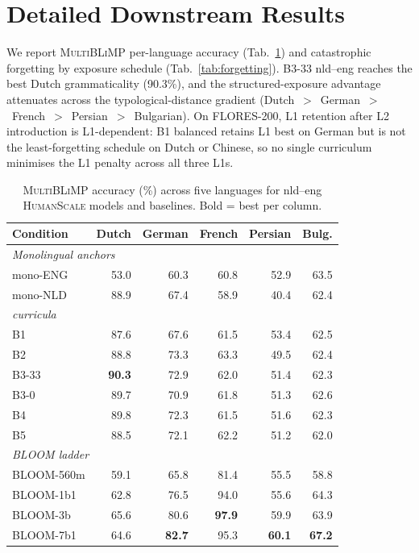  
\section{Detailed Downstream Results}\label{sec:downstream}
 
We report \beetle{} \textsc{MultiBLiMP} per-language accuracy (Tab.~\ref{tab:multiblimp}) and catastrophic forgetting by exposure schedule (Tab.~\ref{tab:forgetting}). B3-33 nld--eng reaches the best \beetle{} Dutch grammaticality (90.3\%), and the structured-exposure advantage attenuates across the typological-distance gradient (Dutch~$>$~German~$>$~French~$>$~Persian~$>$~Bulgarian). On FLORES-200, L1 retention after L2 introduction is L1-dependent: B1 balanced retains L1 best on German but is not the least-forgetting schedule on Dutch or Chinese, so no single curriculum minimises the L1 penalty across all three L1s.
 
\begin{table}[!ht]
  \centering \small
  \caption{\textsc{MultiBLiMP} accuracy (\%) across five languages for nld--eng \textsc{HumanScale} \beetle{} models and baselines. Bold = best per column.}
  \label{tab:multiblimp}
  \begin{tabular}{lrrrrr}
    \toprule
    Condition & Dutch & German & French & Persian & Bulg. \\
    \midrule
    \multicolumn{6}{l}{\emph{Monolingual anchors}} \\
    mono-ENG & 53.0 & 60.3 & 60.8 & 52.9 & 63.5 \\
    mono-NLD & 88.9 & 67.4 & 58.9 & 40.4 & 62.4 \\
    \midrule
    \multicolumn{6}{l}{\emph{\beetle{} curricula}} \\
    B1       & 87.6 & 67.6 & 61.5 & 53.4 & 62.5 \\
    B2       & 88.8 & 73.3 & 63.3 & 49.5 & 62.4 \\
    B3-33    & \textbf{90.3} & 72.9 & 62.0 & 51.4 & 62.3 \\
    B3-0     & 89.7 & 70.9 & 61.8 & 51.3 & 62.6 \\
    B4       & 89.8 & 72.3 & 61.5 & 51.6 & 62.3 \\
    B5       & 88.5 & 72.1 & 62.2 & 51.2 & 62.0 \\
    \midrule
    \multicolumn{6}{l}{\emph{BLOOM ladder}} \\
    BLOOM-560m & 59.1 & 65.8 & 81.4 & 55.5 & 58.8 \\
    BLOOM-1b1  & 62.8 & 76.5 & 94.0 & 55.6 & 64.3 \\
    BLOOM-3b   & 65.6 & 80.6 & \textbf{97.9} & 59.9 & 63.9 \\
    BLOOM-7b1  & 64.6 & \textbf{82.7} & 95.3 & \textbf{60.1} & \textbf{67.2} \\
    \bottomrule
  \end{tabular}
\end{table}
 
